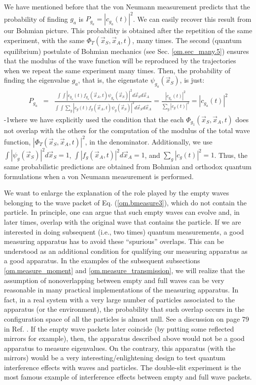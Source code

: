 \documentclass[nofootinbib, secnumarabic, amsmath, nobibnotes,10pt,aps,pra]{revtex4-1}
\newcommand{\sref}[1]{Sec. \ref{#1}}
\newcommand{\eref}[1]{Eq. (\ref{#1})}
\begin{document}
We have mentioned before that the von Neumann measurement predicts that the probability of finding $g_a$ is $P_{g_a} = |c_{g_a}(t)|^2$. We can easily recover this result from our Bohmian picture. This probability is obtained after the repetition of the same experiment, with the same $\Phi_T(\vec x_S,\vec x_A,t)$, many times. The second (quantum equilibrium) postulate of Bohmian mechanics (see \sref{om.sec_many.5}) ensures that the modulus of the wave function will be reproduced by the trajectories when we repeat the same experiment many times. Then, the probability of finding the eigenvalue $g_a$, that is, the eigenstate $\psi_{g_a}(\vec x_S)$, is just:
\begin{eqnarray}
P_{g_a} &=& \frac {\int \int |c_{g_a}(t) f_{g_a}(\vec x_A,t) \psi_{g_a}(\vec x_S)|^2 d\vec x_S d\vec x_A} {\int \int \sum_{g} |c_g(t) f_g(\vec x_A,t) \psi_g(\vec x_S)|^2 d\vec x_S d\vec x_A}= \frac {|c_{g_a}(t)|^2} {\sum_{g} |c_g(t)|^2} = |c_{g_a}(t)|^2
\end{eqnarray}
\looseness-1where we have explicitly used the condition that the each
\textit{$\Phi_{g_1}(\vec x_S,\vec x_A,t)$} does not overlap with the others for the
computation of the modulus of the total wave function,
\textit{$|\Phi_T(\vec x_S,\vec x_A,t)|^2$}, in the denominator.
Additionally, we use $\int |\psi_g(\vec x_S)|^2 d\vec x_S = 1$,
$\int |f_g(\vec x_A,t)|^2 d\vec x_A = 1$, and $\sum_{g} |c_g(t)|^2 =
1$. Thus, the same probabilistic predictions are obtained from
Bohmian and orthodox quantum formulations when a von Neumann
measurement is performed.

We want to enlarge the explanation of the role played by the empty waves belonging to the wave packet of \eref{om.bmeasure3}, which do not contain the particle. In principle, one can argue that such empty waves can evolve and, in later times, overlap with the original wave that contains the particle. If we are interested in doing subsequent (i.e., two times) quantum measurements, a good measuring apparatus has to avoid these ``spurious'' overlaps. This can be understood as an additional condition for qualifying our measuring apparatus as a good apparatus. In the examples of the subsequent subsections \ref{om.measure_moment} and \ref{om.measure_transmission}, we will realize that the assumption of nonoverlapping between empty and full waves can be very reasonable in many practical implementations of the measuring apparatus. In fact, in a real system with a very large number of particles associated to the apparatus (or the environment), the probability that such overlap occurs in the configuration space of all the particles is almost null. See a discussion on page 79 in Ref. \cite{om.bomhhiley1993}. If the empty wave packets later coincide (by putting some reflected mirrors for example), then, the apparatus described above would not be a good apparatus to measure eigenvalues. On the contrary, this apparatus (with the mirrors) would be a very interesting/enlightening design to test quantum interference effects with waves and particles. The double-slit experiment is the most famous example of interference effects between empty and full wave packets.      
\end{document}
